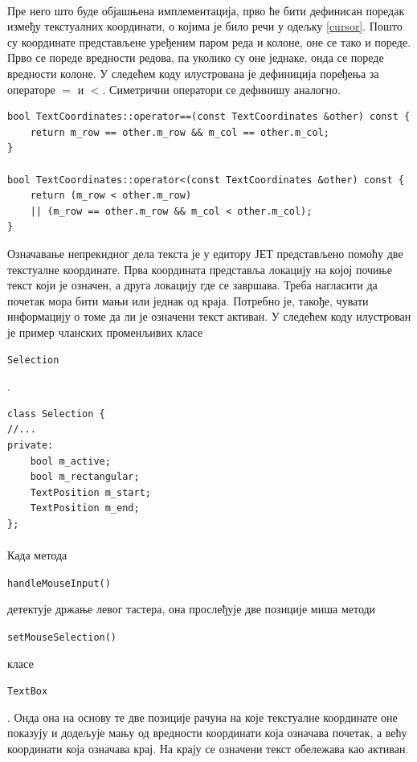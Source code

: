 \documentclass[12pt,oneside]{memoir}
\begin{document}
\paragraph{}
Пре него што буде објашњена имплементација, прво ће бити дефинисан поредак између текстуалних координати, о којима је било речи у одељку \ref{cursor}. Пошто су координате
представљене уређеним паром реда и колоне,  оне се тако и пореде. Прво се пореде вредности редова, па уколико су оне једнаке, онда се пореде вредности колоне. У следећем коду
илустрована је дефиниција поређења за операторе \(=\) и \(<\). Симетрични оператори се дефинишу аналогно.

\begin{verbatim}
bool TextCoordinates::operator==(const TextCoordinates &other) const {
	return m_row == other.m_row && m_col == other.m_col;
}

bool TextCoordinates::operator<(const TextCoordinates &other) const {
	return (m_row < other.m_row) 
	|| (m_row == other.m_row && m_col < other.m_col);
}
\end{verbatim}

Означавање непрекидног дела текста је у едитору ЈЕТ представљено помоћу две текстуалне координате. Прва координата представља локацију на којој почиње текст који је
означен, а друга локацију где се завршава. Треба нагласити да почетак мора бити мањи или једнак од краја. Потребно је, такође, чувати информацију о томе да ли је означени текст активан. У следећем коду илустрован је пример чланских променљивих класе 
\begin{latinica}\verb|Selection|\end{latinica}.

\begin{verbatim}
class Selection {
//...
private:
	bool m_active;
	bool m_rectangular;
	TextPosition m_start;
	TextPosition m_end;
};
\end{verbatim}


\paragraph{}
Када метода \begin{latinica}\verb|handleMouseInput()|\end{latinica} детектује држање
левог тастера, она прослеђује две позиције миша методи \begin{latinica}\verb|setMouseSelection()|\end{latinica} класе
\begin{latinica}\verb|TextBox|\end{latinica}. Онда она на основу те две позиције
рачуна на које текстуалне координате оне показују и додељује мању од вредности координати
која означава почетак, а већу координати која означава крај. 
На крају се означени текст обележава као активан.
\end{document}

